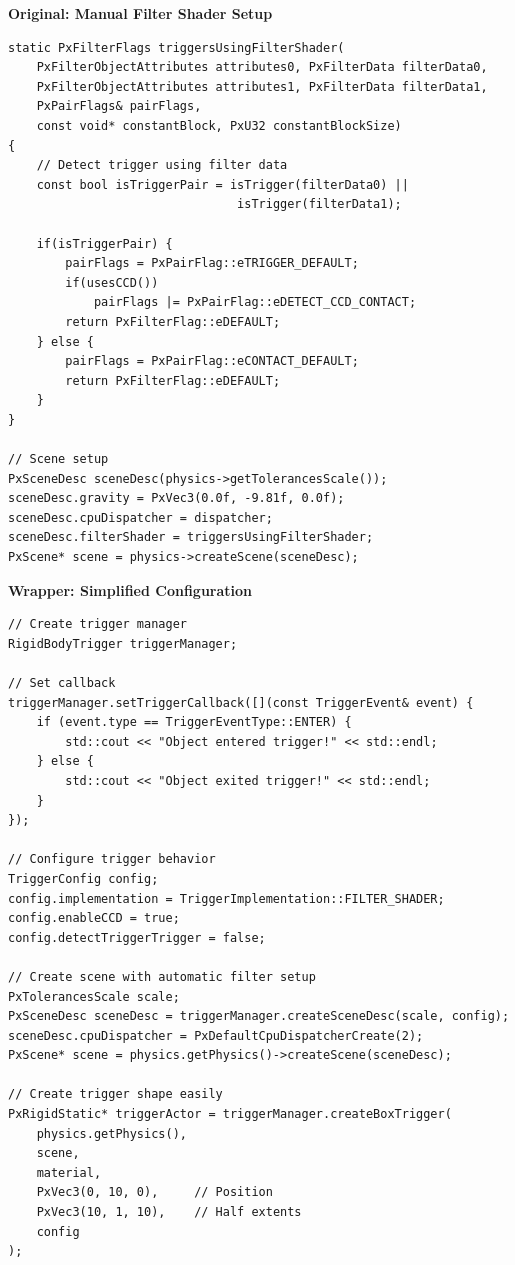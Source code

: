 \textbf{Original: Manual Filter Shader Setup}
\begin{lstlisting}[caption={Original PhysX filter shader for triggers}]
static PxFilterFlags triggersUsingFilterShader(
    PxFilterObjectAttributes attributes0, PxFilterData filterData0,
    PxFilterObjectAttributes attributes1, PxFilterData filterData1,
    PxPairFlags& pairFlags,
    const void* constantBlock, PxU32 constantBlockSize)
{
    // Detect trigger using filter data
    const bool isTriggerPair = isTrigger(filterData0) ||
                                isTrigger(filterData1);

    if(isTriggerPair) {
        pairFlags = PxPairFlag::eTRIGGER_DEFAULT;
        if(usesCCD())
            pairFlags |= PxPairFlag::eDETECT_CCD_CONTACT;
        return PxFilterFlag::eDEFAULT;
    } else {
        pairFlags = PxPairFlag::eCONTACT_DEFAULT;
        return PxFilterFlag::eDEFAULT;
    }
}

// Scene setup
PxSceneDesc sceneDesc(physics->getTolerancesScale());
sceneDesc.gravity = PxVec3(0.0f, -9.81f, 0.0f);
sceneDesc.cpuDispatcher = dispatcher;
sceneDesc.filterShader = triggersUsingFilterShader;
PxScene* scene = physics->createScene(sceneDesc);
\end{lstlisting}

\textbf{Wrapper: Simplified Configuration}
\begin{lstlisting}[caption={Wrapper: Config-driven trigger setup}]
// Create trigger manager
RigidBodyTrigger triggerManager;

// Set callback
triggerManager.setTriggerCallback([](const TriggerEvent& event) {
    if (event.type == TriggerEventType::ENTER) {
        std::cout << "Object entered trigger!" << std::endl;
    } else {
        std::cout << "Object exited trigger!" << std::endl;
    }
});

// Configure trigger behavior
TriggerConfig config;
config.implementation = TriggerImplementation::FILTER_SHADER;
config.enableCCD = true;
config.detectTriggerTrigger = false;

// Create scene with automatic filter setup
PxTolerancesScale scale;
PxSceneDesc sceneDesc = triggerManager.createSceneDesc(scale, config);
sceneDesc.cpuDispatcher = PxDefaultCpuDispatcherCreate(2);
PxScene* scene = physics.getPhysics()->createScene(sceneDesc);

// Create trigger shape easily
PxRigidStatic* triggerActor = triggerManager.createBoxTrigger(
    physics.getPhysics(),
    scene,
    material,
    PxVec3(0, 10, 0),     // Position
    PxVec3(10, 1, 10),    // Half extents
    config
);
\end{lstlisting}

